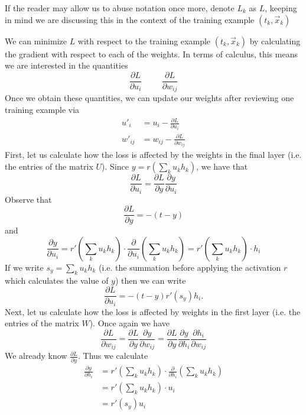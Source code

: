 \documentclass[12pt,letterpaper]{book}
\theoremstyle{definition}
\begin{document}
  If the reader may allow us to abuse notation once more, denote 
  $L_k$ as $L$, keeping in mind we are discussing this in the context of the
  training example $(t_k, \vec{x}_k)$
  
  
  
  
  We can minimize $L$ with respect to the training example $(t_k, \vec{x}_k)$ 
  by calculating the gradient with respect to each of the weights.
  In terms of calculus, this means we are interested in the quantities 
  \[
      \frac{\partial L}{\partial u_i} \hspace{1cm} \frac{\partial L}{\partial w_{ij}}
  \]
  Once we obtain these quantities, we can update our weights after reviewing one training
  example via
  \begin{align}
    u'_i &= u_i - \frac{\partial L}{\partial u_i} \\
    w'_{ij}  &= w_{ij} - \frac{\partial L}{\partial w_{ij}}
  \end{align}
  First, let us calculate how the loss is affected by the weights in the final layer (i.e. the 
  entries of the matrix $U$). Since $y = r(\sum_{k}u_{k}h_k)$, we have that 
  \[
    \frac{\partial L}{\partial u_i} = \frac{\partial L}{\partial y}\frac{\partial y}{\partial u_i}
  \]
  Observe that 
  \[
    \frac{\partial L}{\partial y} = -(t - y)
  \]
  and 
  \[
    \frac{\partial y}{\partial u_i} 
    = r'\left(\sum_{k}u_{k}h_k\right) \cdot \frac{\partial }{\partial u_i}\left(\sum_{k}u_{k}h_k\right)
    = r'\left(\sum_{k}u_{k}h_k\right) \cdot h_i
  \]
  If we write $s_y = \sum_{k}u_kh_k$ (i.e. the summation before applying the activation $r$ 
  which calculates the value of $y$) then we can write
  \[
    \frac{\partial L}{\partial u_i}
    = 
    -(t - y)r'(s_y)h_i.
  \]
  Next, let us calculate how the loss is affected by weights in the first layer (i.e. the entries 
  of the matrix $W$). Once again we have 
  \[
    \frac{\partial L}{\partial w_{ij}} = \frac{\partial L}{\partial y}\frac{\partial y}{\partial w_{ij}} = \frac{\partial L}{\partial y}\frac{\partial y}{\partial h_{i}}
    \frac{\partial h_i}{\partial w_{ij}} 
  \]
  We already know $\frac{\partial L}{\partial y}$. Thus we calculate 
  \begin{align}
    \frac{\partial y}{\partial h_{i}}
    &= r'\left(\sum_{k}u_{k}h_k\right) \cdot \frac{\partial }{\partial h_i}\left(\sum_{k}u_{k}h_k\right)\\
    &= r'\left(\sum_{k}u_{k}h_k\right) \cdot u_i\\
    &= r'(s_{y})u_i
  \end{align}
\end{document}
